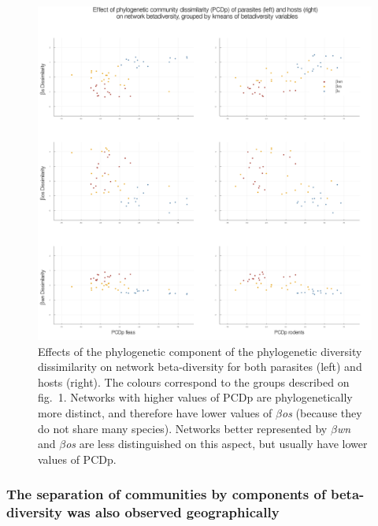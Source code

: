 \documentclass[11pt]{article}
\makeatletter
\def\maxwidth{\ifdim\Gin@nat@width>\linewidth\linewidth
\else\Gin@nat@width\fi}
\let\Oldincludegraphics\includegraphics
\renewcommand{\includegraphics}[1]{\Oldincludegraphics[width=\maxwidth]{#1}}
\makeatother
\begin{document}
\begin{figure}
\hypertarget{fig:twoB}{%
\centering
\includegraphics{figures/fig2B.png}
\caption{Effects of the phylogenetic component of the phylogenetic
diversity dissimilarity on network beta-diversity for both parasites
(left) and hosts (right). The colours correspond to the groups described
on fig.~1. Networks with higher values of PCDp are phylogenetically more
distinct, and therefore have lower values of \emph{\(\beta\)os} (because
they do not share many species). Networks better represented by
\emph{\(\beta\)wn} and \emph{\(\beta\)os} are less distinguished on this
aspect, but usually have lower values of PCDp.}\label{fig:twoB}
}
\end{figure}

\hypertarget{the-separation-of-communities-by-components-of-beta-diversity-was-also-observed-geographically}{%
\subsubsection{The separation of communities by components of
beta-diversity was also observed
geographically}\label{the-separation-of-communities-by-components-of-beta-diversity-was-also-observed-geographically}}
\end{document}
